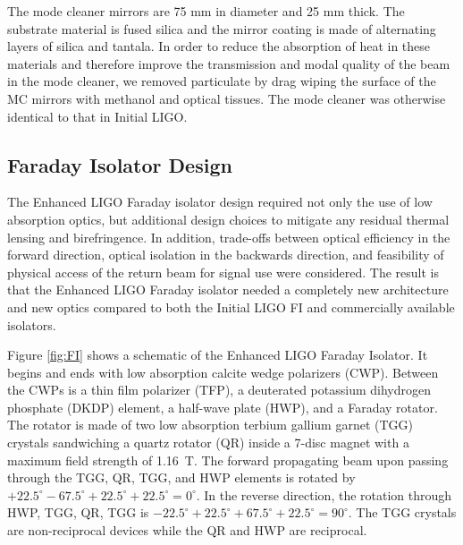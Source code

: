 The mode cleaner mirrors are 75 mm in diameter and 25 mm thick. The
substrate material is fused silica and the mirror coating is made of
alternating layers of silica and tantala. In order to reduce the
absorption of heat in these materials and therefore improve the
transmission and modal quality of the beam in the mode cleaner, we
removed particulate by drag wiping the surface of the MC mirrors with
methanol and optical tissues. The mode cleaner was otherwise identical
to that in Initial LIGO.



\subsection{Faraday Isolator Design}
The Enhanced LIGO Faraday isolator design required not only the use of
low absorption optics, but additional design choices to mitigate any
residual thermal lensing and birefringence. In addition, trade-offs
between optical efficiency in the forward direction, optical isolation
in the backwards direction, and feasibility of physical access of the
return beam for signal use were considered. The result is that the
Enhanced LIGO Faraday isolator needed a completely new architecture
and new optics compared to both the Initial LIGO FI and commercially
available isolators.

Figure \ref{fig:FI} shows a schematic of the Enhanced LIGO Faraday
Isolator. It begins and ends with low absorption calcite wedge
polarizers (CWP). Between the CWPs is a thin film polarizer (TFP), a
deuterated potassium dihydrogen phosphate (DKDP) element, a half-wave
plate (HWP), and a Faraday rotator. The rotator is made of two low
absorption terbium gallium garnet (TGG) crystals sandwiching a quartz
rotator (QR) inside a 7-disc magnet with a maximum field strength of
1.16~T. The forward propagating beam upon passing through the TGG, QR,
TGG, and HWP elements is rotated by $+22.5^\circ - 67.5^\circ +
22.5^\circ + 22.5^\circ = 0^\circ$. In the reverse direction, the
rotation through HWP, TGG, QR, TGG is $-22.5^\circ + 22.5^\circ +
67.5^\circ + 22.5^\circ = 90^\circ$. The TGG crystals are
non-reciprocal devices while the QR and HWP are reciprocal.

